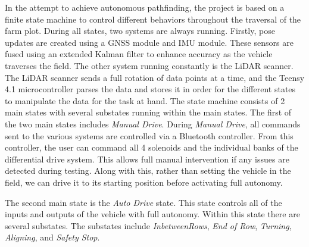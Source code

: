\documentclass[conference]{IEEEtran}
\begin{document}
In the attempt to achieve autonomous pathfinding, the project is based on a finite state machine to control different behaviors throughout the traversal of the farm plot. During all states, two systems are always running. Firstly, pose updates are created using a GNSS module and IMU module. These sensors are fused using an extended Kalman filter to enhance accuracy as the vehicle traverses the field. The other system running constantly is the LiDAR scanner. The LiDAR scanner sends a full rotation of data points at a time, and the Teensy 4.1 microcontroller parses the data and stores it in order for the different states to manipulate the data for the task at hand.  The state machine consists of 2 main states with several substates running within the main states. The first of the two main states includes \textit{Manual Drive}. During \textit{Manual Drive}, all commands sent to the various systems are controlled via a Bluetooth controller. From this controller, the user can command all 4 solenoids and the individual banks of the differential drive system. This allows full manual intervention if any issues are detected during testing. Along with this, rather than setting the vehicle in the field, we can drive it to its starting position before activating full autonomy.

The second main state is the \textit{Auto Drive} state. This state controls all of the inputs and outputs of the vehicle with full autonomy. Within this state there are several substates. The substates include \textit{InbetweenRows}, \textit{End of Row}, \textit{Turning}, \textit{Aligning}, and \textit{Safety Stop}.
\end{document}
